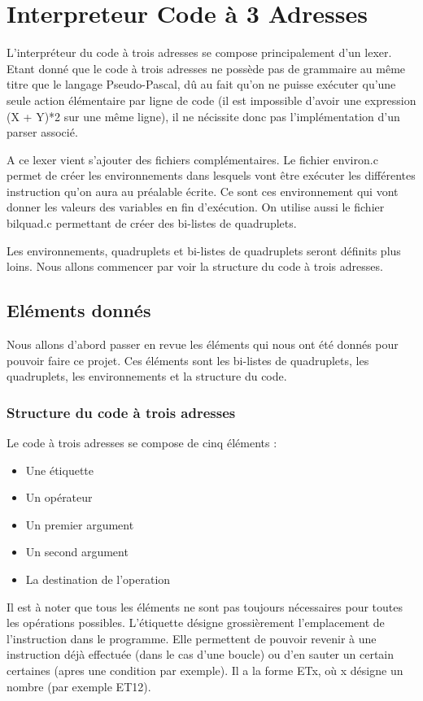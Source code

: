 \documentclass{article}
\begin{document}
\newpage
\section{Interpreteur Code à 3 Adresses}

L'interpréteur du code à trois adresses se compose principalement d'un lexer. Etant donné que le code à trois adresses ne possède pas de grammaire au même titre que le langage Pseudo-Pascal,
dû au fait qu'on ne puisse exécuter qu'une seule action élémentaire par ligne de code (il est impossible d'avoir une expression (X + Y)*2 sur une même ligne), il ne nécissite donc pas l'implémentation d'un parser associé.

A ce lexer vient s'ajouter des fichiers complémentaires. Le fichier environ.c permet de créer les environnements dans lesquels vont être exécuter les différentes instruction qu'on aura au préalable écrite. Ce sont ces environnement qui vont donner les valeurs des variables en fin d'exécution.
On utilise aussi le fichier bilquad.c permettant de créer des bi-listes de quadruplets.

Les environnements, quadruplets et bi-listes de quadruplets seront définits plus loins. Nous allons commencer par voir la structure du code à trois adresses.


\subsection{Eléments donnés}
Nous allons d'abord passer en revue les éléments qui nous ont été donnés pour pouvoir faire ce projet. Ces éléments sont les bi-listes de quadruplets, les quadruplets, les environnements et la structure du code.
\subsubsection{Structure du code à trois adresses}

Le code à trois adresses se compose de cinq éléments :
\begin{itemize}
\item Une étiquette
\item Un opérateur
\item Un premier argument
\item Un second argument
\item La destination de l'operation
\end{itemize}

Il est à noter que tous les éléments ne sont pas toujours nécessaires pour toutes les opérations possibles.
\medbreak
L'étiquette désigne grossièrement l'emplacement de l'instruction dans le programme. Elle permettent de pouvoir revenir à une instruction déjà effectuée (dans le cas d'une boucle) ou d'en sauter un certain certaines (apres une condition par exemple). Il a la forme ETx, où x désigne un nombre (par exemple ET12).
\end{document}
